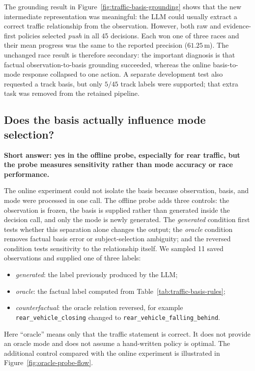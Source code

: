 \documentclass[11pt]{article}
\newcommand{\code}[1]{\texttt{#1}}
\begin{document}
The grounding result in Figure~\ref{fig:traffic-basis-grounding} shows that the
new intermediate representation was meaningful: the LLM could usually extract
a correct traffic relationship from the observation. However, both raw and
evidence-first policies selected \emph{push} in all 45 decisions. Each won one
of three races and their mean progress was the same to the reported precision
($61.25\,\mathrm{m}$). The unchanged race result is therefore secondary: the
important diagnosis is that factual observation-to-basis grounding succeeded,
whereas the online basis-to-mode response collapsed to one action. A separate
development test also requested a track basis, but only $5/45$ track labels
were supported; that extra task was removed from the retained pipeline.

\subsection{Does the basis actually influence mode selection?}

\noindent\textbf{Short answer: yes in the offline probe, especially for rear
traffic, but the probe measures sensitivity rather than mode accuracy or race
performance.}

The online experiment could not isolate the basis because observation, basis,
and mode were processed in one call. The offline probe adds three controls: the
observation is frozen, the basis is supplied rather than generated inside the
decision call, and only the mode is newly generated. The \emph{generated}
condition first tests whether this separation alone changes the output; the
\emph{oracle} condition removes factual basis error or subject-selection
ambiguity; and the reversed condition tests sensitivity to the relationship
itself. We sampled 11 saved observations and supplied one of three labels:

\begin{itemize}
  \item \emph{generated}: the label previously produced by the LLM;
  \item \emph{oracle}: the factual label computed from
  Table~\ref{tab:traffic-basis-rules};
  \item \emph{counterfactual}: the oracle relation reversed, for example
  \code{rear\_vehicle\_closing} changed to
  \code{rear\_vehicle\_falling\_behind}.
\end{itemize}

Here ``oracle'' means only that the traffic statement is correct. It does not
provide an oracle mode and does not assume a hand-written policy is optimal.
The additional control compared with the online experiment is illustrated in
Figure~\ref{fig:oracle-probe-flow}.
\end{document}
